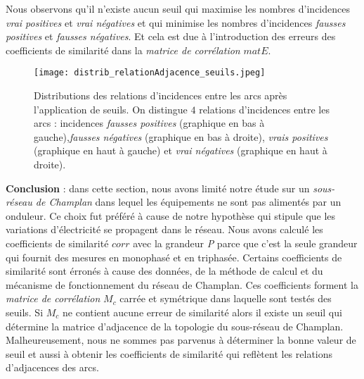 Nous observons qu'il n'existe aucun seuil qui 
maximise les nombres d'incidences {\em vrai positives}  et {\em vrai n\'egatives}  et qui
minimise les nombres  d'incidences {\em fausses positives} et {\em fausses n\'egatives}.
Et cela est due \`a l'introduction des erreurs des coefficients de similarit\'e dans la {\em matrice de corr\'elation} $matE$.
		\begin{figure}[htb!] 
		\centering
		\texttt{[image: distrib\_relationAdjacence\_seuils.jpeg]}
		\caption{ Distributions des relations d'incidences entre les arcs apr\`es l'application  de seuils. On distingue $4$ relations d'incidences entre les arcs : incidences {\em fausses positives} (graphique en bas \`a gauche),{\em fausses n\'egatives} (graphique en bas \`a droite), {\em vrais positives} (graphique en haut \`a gauche) et {\em vrai n\'egatives} (graphique en haut \`a droite).
		}
		\label{distrib_relationAdjacence_seuils_distancePerson}
		\end{figure}
\newline

{\bf Conclusion} :
dans cette section, nous avons limit\'e notre \'etude sur un {\em sous-r\'eseau de Champlan} dans lequel les \'equipements ne sont pas aliment\'es par un onduleur. Ce choix fut pr\'ef\'er\'e \`a cause de notre hypoth\`ese qui stipule que les variations d'\'electricit\'e se propagent dans le r\'eseau. Nous avons calcul\'e les coefficients de similarit\'e $corr$ avec la grandeur {\em P} parce que c'est la seule grandeur qui fournit des mesures en monophas\'e et en triphas\'ee. Certains coefficients de similarit\'e sont \'erron\'es \`a cause des donn\'ees, de la m\'ethode de calcul  et du m\'ecanisme de fonctionnement du r\'eseau de Champlan. Ces coefficients forment la {\em matrice de corr\'elation} $M_c$ carr\'ee et sym\'etrique dans laquelle sont test\'es des seuils. 
Si $M_c$ ne contient aucune erreur de similarit\'e alors il existe un seuil qui d\'etermine la matrice d'adjacence de la topologie du sous-r\'eseau de Champlan. Malheureusement, nous ne sommes pas parvenus \`a d\'eterminer la bonne valeur de seuil et aussi \`a obtenir les coefficients de similarit\'e qui refl\`etent les relations d'adjacences des arcs.

